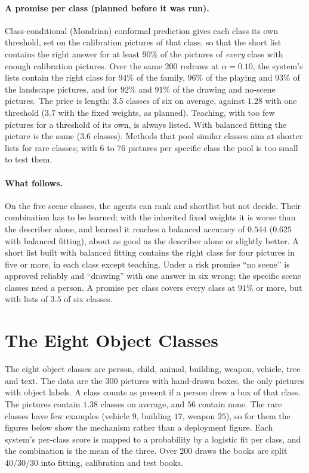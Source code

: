 \paragraph{A promise per class (planned before it was run).} Class-conditional (Mondrian) conformal prediction \cite{vovk2012conditional} gives each class its own threshold, set on the calibration pictures of that class, so that the short list contains the right answer for at least $90\%$ of the pictures of \emph{every} class with enough calibration pictures. Over the same 200 redraws at $\alpha=0.10$, the system's lists contain the right class for $94\%$ of the family, $96\%$ of the playing and $93\%$ of the landscape pictures, and for $92\%$ and $91\%$ of the drawing and no-scene pictures. The price is length: $3.5$ classes of six on average, against $1.28$ with one threshold ($3.7$ with the fixed weights, as planned). Teaching, with too few pictures for a threshold of its own, is always listed. With balanced fitting the picture is the same ($3.6$ classes). Methods that pool similar classes \cite{ding2023classconditional} aim at shorter lists for rare classes; with $6$ to $76$ pictures per specific class the pool is too small to test them.

\paragraph{What follows.} On the five scene classes, the agents can rank and shortlist but not decide. Their combination has to be learned: with the inherited fixed weights it is worse than the describer alone, and learned it reaches a balanced accuracy of $0.544$ ($0.625$ with balanced fitting), about as good as the describer alone or slightly better. A short list built with balanced fitting contains the right class for four pictures in five or more, in each class except teaching. Under a risk promise ``no scene'' is approved reliably and ``drawing'' with one answer in six wrong; the specific scene classes need a person. A promise per class covers every class at $91\%$ or more, but with lists of $3.5$ of six classes.

\section{The Eight Object Classes}
\label{sec:objects_llava_vs_fusion}

The eight object classes are person, child, animal, building, weapon, vehicle, tree and text. The data are the $300$ pictures with hand-drawn boxes, the only pictures with object labels. A class counts as present if a person drew a box of that class. The pictures contain $1.38$ classes on average, and $56$ contain none. The rare classes have few examples (vehicle $9$, building $17$, weapon $25$), so for them the figures below show the mechanism rather than a deployment figure. Each system's per-class score is mapped to a probability by a logistic fit per class, and the combination is the mean of the three. Over $200$ draws the books are split $40/30/30$ into fitting, calibration and test books.

